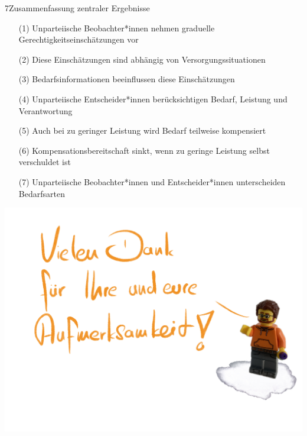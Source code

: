 \documentclass[xcolor=table,9pt,aspectratio=169]{beamer}
\begin{document}
\begin{frame}{\vspace*{10mm}7\hspace*{1em}Zusammenfassung zentraler Ergebnisse}
\vspace*{-10mm}
\begin{itemize}
   \item[(1)] Unparteiische Beobachter*innen nehmen graduelle Gerechtigkeitseinschätzungen vor
   \item[(2)] Diese Einschätzungen sind abhängig von Versorgungssituationen
   \item[(3)] Bedarfsinformationen beeinflussen diese Einschätzungen
\end{itemize}
\vspace{1em}
\begin{itemize}
   \item[(4)] Unparteiische Entscheider*innen berücksichtigen Bedarf, Leistung und Verantwortung
   \item[(5)] Auch bei zu geringer Leistung wird Bedarf teilweise kompensiert
   \item[(6)] Kompensationsbereitschaft sinkt, wenn zu geringe Leistung selbst verschuldet ist
\end{itemize}
\vspace{1em}
\begin{itemize}
   \item[(7)] Unparteiische Beobachter*innen und Entscheider*innen unterscheiden Bedarfsarten
\end{itemize}
\end{frame}


\begin{frame}{}
\begin{center}
   \includegraphics[width=0.8\linewidth]{figures/slides_thanks.pdf}
\end{center}
\end{frame}
\end{document}
